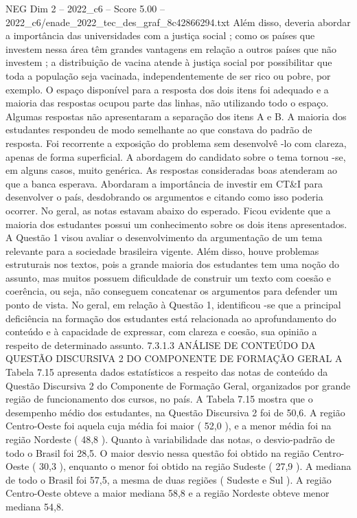 \begin{textsample}{NEG Dim 2 – 2022\_c6 – Score 5.00 – 2022\_c6/enade\_2022\_tec\_des\_graf\_8c42866294.txt}
Além disso, deveria abordar a importância das universidades com a justiça social ; como os países que investem nessa área têm grandes vantagens em relação a outros países que não investem ; a distribuição de vacina atende à justiça social por possibilitar que toda a população seja vacinada, independentemente de ser rico ou pobre, por exemplo.
O espaço disponível para a resposta dos dois itens foi adequado e a maioria das respostas ocupou parte das linhas, não utilizando todo o espaço.
Algumas respostas não apresentaram a separação dos itens A e B.
A maioria dos estudantes respondeu de modo semelhante ao que constava do padrão de resposta.
Foi recorrente a exposição do problema sem desenvolvê -lo com clareza, apenas de forma superficial.
A abordagem do candidato sobre o tema tornou -se, em alguns casos, muito genérica.
As respostas consideradas boas atenderam ao que a banca esperava.
Abordaram a importância de investir em CT\&I para desenvolver o país, desdobrando os argumentos e citando como isso poderia ocorrer.
No geral, as notas estavam abaixo do esperado.
Ficou evidente que a maioria dos estudantes possui um conhecimento sobre os dois itens apresentados.
A Questão 1 visou avaliar o desenvolvimento da argumentação de um tema relevante para a sociedade brasileira vigente.
Além disso, houve problemas estruturais nos textos, pois a grande maioria dos estudantes tem uma noção do assunto, mas muitos possuem dificuldade de construir um texto com coesão e coerência, ou seja, não conseguem concatenar os argumentos para defender um ponto de vista.
No geral, em relação à Questão 1, identificou -se que a principal deficiência na formação dos estudantes está relacionada ao aprofundamento do conteúdo e à capacidade de expressar, com clareza e coesão, sua opinião a respeito de determinado assunto. 7.3.1.3 ANÁLISE DE CONTEÚDO DA QUESTÃO DISCURSIVA 2 DO COMPONENTE DE FORMAÇÃO GERAL A Tabela 7.15 apresenta dados estatísticos a respeito das notas de conteúdo da Questão Discursiva 2 do Componente de Formação Geral, organizados por grande região de funcionamento dos cursos, no país.
A Tabela 7.15 mostra que o desempenho médio dos estudantes, na Questão Discursiva 2 foi de 50,6.
A região Centro-Oeste foi aquela cuja média foi maior ( 52,0 ), e a menor média foi na região Nordeste ( 48,8 ).
Quanto à variabilidade das notas, o desvio-padrão de todo o Brasil foi 28,5.
O maior desvio nessa questão foi obtido na região Centro-Oeste ( 30,3 ), enquanto o menor foi obtido na região Sudeste ( 27,9 ).
A mediana de todo o Brasil foi 57,5, a mesma de duas regiões ( Sudeste e Sul ).
A região Centro-Oeste obteve a maior mediana 58,8 e a região Nordeste obteve menor mediana 54,8.

\end{textsample}
